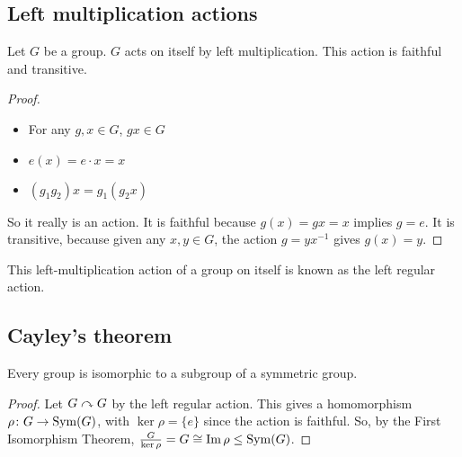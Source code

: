 \subsection{Left multiplication actions}
\begin{lemma}
	Let \(G\) be a group.
	\(G\) acts on itself by left multiplication.
	This action is faithful and transitive.
\end{lemma}
\begin{proof}
	\begin{itemize}
		\item For any \(g, x \in G\), \(gx \in G\)
		\item \(e(x) = e \cdot x = x\)
		\item \((g_1 g_2) x = g_1 (g_2 x)\)
	\end{itemize}
	So it really is an action.
	It is faithful because \(g(x) = gx = x\) implies \(g = e\).
	It is transitive, because given any \(x, y \in G\), the action \(g = yx^{-1}\) gives \(g(x) = y\).
\end{proof}
\begin{definition}
	This left-multiplication action of a group on itself is known as the left regular action.
\end{definition}

\subsection{Cayley's theorem}
\begin{theorem}
	Every group is isomorphic to a subgroup of a symmetric group.
\end{theorem}
\begin{proof}
	Let \(G \curvearrowright G\) by the left regular action.
	This gives a homomorphism \(\rho\colon G \to \operatorname{Sym}(G)\), with \(\ker \rho = \{ e \}\) since the action is faithful.
	So, by the First Isomorphism Theorem, \(\frac{G}{\ker \rho} = G \cong \Im \rho \leq \operatorname{Sym}(G)\).
\end{proof}

